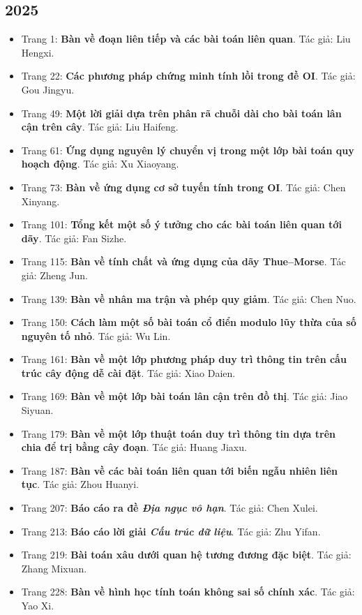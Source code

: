 \documentclass[11pt]{article}
\begin{document}
\subsection{2025}
\begin{itemize}[leftmargin=2em]
  \item Trang 1: \textbf{Bàn về đoạn liên tiếp và các bài toán liên quan}. Tác giả: Liu Hengxi.
  \item Trang 22: \textbf{Các phương pháp chứng minh tính lồi trong đề OI}. Tác giả: Gou Jingyu.
  \item Trang 49: \textbf{Một lời giải dựa trên phân rã chuỗi dài cho bài toán lân cận trên cây}. Tác giả: Liu Haifeng.
  \item Trang 61: \textbf{Ứng dụng nguyên lý chuyển vị trong một lớp bài toán quy hoạch động}. Tác giả: Xu Xiaoyang.
  \item Trang 73: \textbf{Bàn về ứng dụng cơ sở tuyến tính trong OI}. Tác giả: Chen Xinyang.
  \item Trang 101: \textbf{Tổng kết một số ý tưởng cho các bài toán liên quan tới dãy}. Tác giả: Fan Sizhe.
  \item Trang 115: \textbf{Bàn về tính chất và ứng dụng của dãy Thue--Morse}. Tác giả: Zheng Jun.
  \item Trang 139: \textbf{Bàn về nhân ma trận và phép quy giảm}. Tác giả: Chen Nuo.
  \item Trang 150: \textbf{Cách làm một số bài toán cổ điển modulo lũy thừa của số nguyên tố nhỏ}. Tác giả: Wu Lin.
  \item Trang 161: \textbf{Bàn về một lớp phương pháp duy trì thông tin trên cấu trúc cây động dễ cài đặt}. Tác giả: Xiao Daien.
  \item Trang 169: \textbf{Bàn về một lớp bài toán lân cận trên đồ thị}. Tác giả: Jiao Siyuan.
  \item Trang 179: \textbf{Bàn về một lớp thuật toán duy trì thông tin dựa trên chia để trị bằng cây đoạn}. Tác giả: Huang Jiaxu.
  \item Trang 187: \textbf{Bàn về các bài toán liên quan tới biến ngẫu nhiên liên tục}. Tác giả: Zhou Huanyi.
  \item Trang 207: \textbf{Báo cáo ra đề \emph{Địa ngục vô hạn}}. Tác giả: Chen Xulei.
  \item Trang 213: \textbf{Báo cáo lời giải \emph{Cấu trúc dữ liệu}}. Tác giả: Zhu Yifan.
  \item Trang 219: \textbf{Bài toán xâu dưới quan hệ tương đương đặc biệt}. Tác giả: Zhang Mixuan.
  \item Trang 228: \textbf{Bàn về hình học tính toán không sai số chính xác}. Tác giả: Yao Xi.

\end{itemize}
\end{document}
